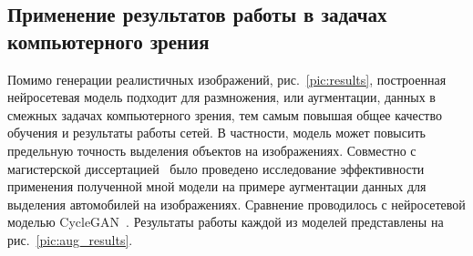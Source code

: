 \documentclass[11pt,a4paper]{extarticle}
\begin{document}
{		\subsection{Применение результатов работы в задачах компьютерного зрения}\label{sec:results:aug}

			Помимо генерации реалистичных изображений, рис.~\ref{pic:results}, построенная нейросетевая модель подходит для размножения, или аугментации, данных в смежных задачах компьютерного зрения, тем самым повышая общее качество обучения и результаты работы сетей.
			В частности, модель может повысить предельную точность выделения объектов на изображениях.
			\newline\newline
			Совместно с магистерской диссертацией~\cite{disser_aug} было проведено исследование эффективности применения полученной мной модели на примере аугментации данных для выделения автомобилей на изображениях.
			Сравнение проводилось с нейросетевой моделью CycleGAN~\cite{CycleGAN}. Результаты работы каждой из моделей представлены на рис.~\ref{pic:aug_results}.

}
\end{document}
